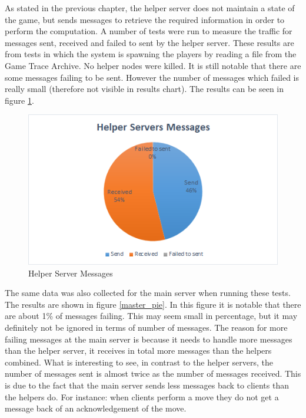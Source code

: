 As stated in the previous chapter, the helper server does not maintain a state of the game, but sends messages to retrieve the required information in order to perform the computation. 
A number of tests were run to measure the traffic for messages sent, received and failed to sent by the helper server.
These results are from tests in which the system is spawning the players by reading a file from the Game Trace Archive.
No helper nodes were killed.
It is still notable that there are some messages failing to be sent. 
However the number of messages which failed is really small (therefore not visible in results chart).
The results can be seen in figure \ref{helper_pie}.


\begin{figure}[!ht]
\centering
\includegraphics[scale=0.8]{images/helper_pie.png}
\caption{Helper Server Messages}
\label{helper_pie}
\end{figure}

The same data was also collected for the main server when running these tests.
The results are shown in figure \ref{master_pie}.
In this figure it is notable that there are about 1\% of messages failing.
This may seem small in percentage, but it may definitely not be ignored in terms of number of messages.
The reason for more failing messages at the main server is because it needs to handle more messages than the helper server, it receives in total more messages than the helpers combined.
What is interesting to see, in contrast to the helper servers, the number of messages sent is almost twice as the number of messages received.
This is due to the fact that the main server sends less messages back to clients than the helpers do.
For instance: when clients perform a move they do not get a message back of an acknowledgement of the move.


